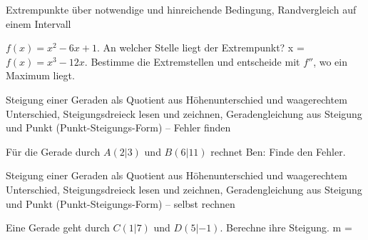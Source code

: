 \begin{aufgabe}{Extrempunkte über notwendige und hinreichende Bedingung, Randvergleich auf einem Intervall}
\begin{teile}
\teil $f(x) = x^2 - 6x + 1$. An welcher Stelle liegt der Extrempunkt? x = \leerfeld
\teil $f(x) = x^3 - 12x$. Bestimme die Extremstellen und entscheide mit $f''$, wo ein Maximum liegt. \leerfeld
\end{teile}
\end{aufgabe}

\begin{aufgabe}{Steigung einer Geraden als Quotient aus Höhenunterschied und waagerechtem Unterschied, Steigungsdreieck lesen und zeichnen, Geradengleichung aus Steigung und Punkt (Punkt-Steigungs-Form) – Fehler finden}
\begin{teile}
\teil Für die Gerade durch $A(2 | 3)$ und $B(6 | 11)$ rechnet Ben:  Finde den Fehler.
\end{teile}
\end{aufgabe}

\begin{aufgabe}{Steigung einer Geraden als Quotient aus Höhenunterschied und waagerechtem Unterschied, Steigungsdreieck lesen und zeichnen, Geradengleichung aus Steigung und Punkt (Punkt-Steigungs-Form) – selbst rechnen}
\begin{teile}
\teil Eine Gerade geht durch $C(1 | 7)$ und $D(5 | -1)$. Berechne ihre Steigung. m = \leerfeld
\end{teile}
\end{aufgabe}
